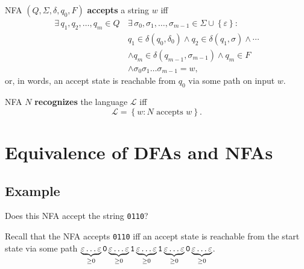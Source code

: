 \documentclass{notes}
\begin{document}
\newpage

\begin{defn}
  NFA $(Q, \Sigma, \delta, q_0, F)$ {\boldmath \bfseries accepts} a string $w$ iff 
  \begin{align*}
    \exists \, q_1, q_2, \dots, q_m \in Q \, &\exists \, \sigma_0, \sigma_1, \dots, \sigma_{m - 1} \in \Sigma \cup \left \{ \varepsilon \right \}: \\ 
    &q_1 \in \delta(q_0, \delta_0) \land q_2 \in \delta(q_1, \sigma) \land \cdots \\ 
    &\land q_m \in \delta(q_{m - 1}, \sigma_{m - 1}) \land q_m \in F \\ 
    &\land \sigma_0 \sigma_1 \dots \sigma_{m - 1} = w, 
  \end{align*}
  or, in words, an accept state is reachable from $q_0$ via some path on input $w$.
\end{defn}

\begin{defn}
  NFA $N$ {\boldmath \bfseries recognizes} the language $\mathcal L$ iff 
  \[
    \mathcal L = \left \{ w : \text{$N$ accepts $w$} \right \}.
  \]
\end{defn}

\section{Equivalence of DFAs and NFAs}

\subsection{Example}

Does this NFA accept the string \verb~0110~?

\begin{center}
\end{center}

Recall that the NFA accepts \verb~0110~ iff an accept state is reachable from the start state via some path $\underbrace{\varepsilon \dots \varepsilon}_{\geq 0} \verb~0~ \underbrace{\varepsilon \dots \varepsilon}_{\geq 0} \verb~1~ \underbrace{\varepsilon \dots \varepsilon}_{\geq 0} \verb~1~ \underbrace{\varepsilon \dots \varepsilon}_{\geq 0} \verb~0~ \underbrace{\varepsilon \dots \varepsilon}_{\geq 0}$.
\end{document}
